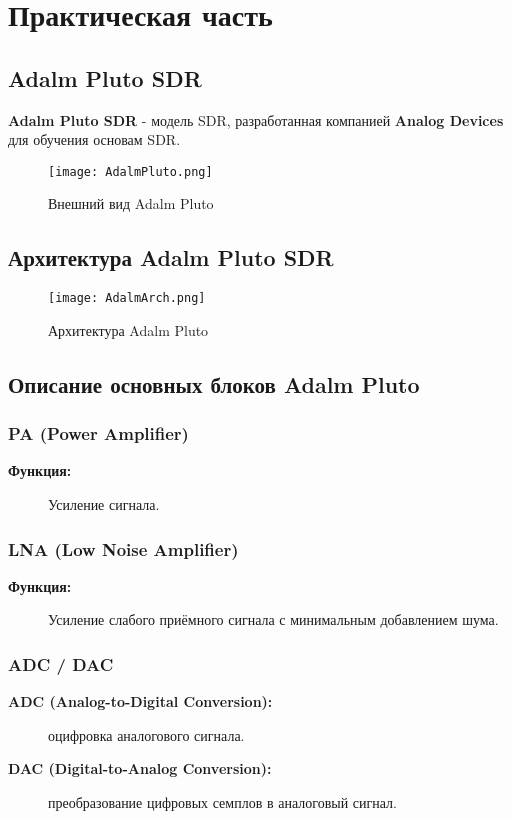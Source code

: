 \chapter{Практическая часть}
\label{ch:chap2}

\section*{Adalm Pluto SDR}

\textbf{Adalm Pluto SDR} - модель SDR, разработанная компанией \textbf{Analog Devices} для обучения основам SDR.

\begin{figure}[H]
    \centering
    \texttt{[image: AdalmPluto.png]}
    \caption{Внешний вид Adalm Pluto}
\end{figure}

\section*{Архитектура Adalm Pluto SDR}

\begin{figure}[H]
    \centering
    \texttt{[image: AdalmArch.png]}
    \caption{Архитектура Adalm Pluto}
\end{figure}

\section*{Описание основных блоков Adalm Pluto}

\subsection*{\textbf{PA (Power Amplifier)}}
\begin{description}
  \item[\textbf{Функция:}] Усиление сигнала.
\end{description}

\subsection*{\textbf{LNA (Low Noise Amplifier)}}
\begin{description}
  \item[\textbf{Функция:}] Усиление слабого приёмного сигнала с минимальным добавлением шума.
\end{description}

\subsection*{\textbf{ADC / DAC}}
\begin{description}
  \item[\textbf{ADC (Analog-to-Digital Conversion):}] оцифровка аналогового сигнала.
  \item[\textbf{DAC (Digital-to-Analog Conversion):}] преобразование цифровых семплов в аналоговый сигнал.
\end{description}

